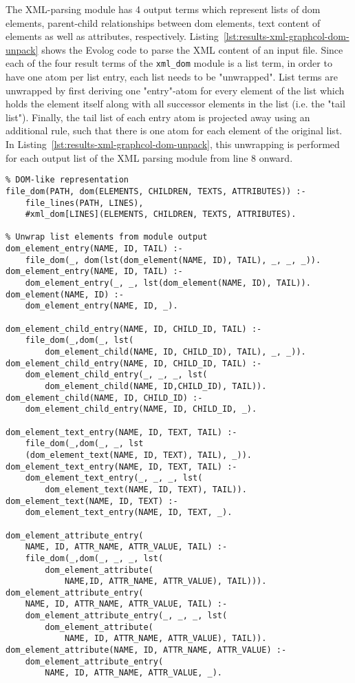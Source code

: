 The XML-parsing module has 4 output terms which represent lists of \gls{dom} elements, parent-child relationships between \gls{dom} elements, text content of elements as well as attributes, respectively. Listing~\ref{lst:results-xml-graphcol-dom-unpack} shows the Evolog code to parse the XML content of an input file. Since each of the four result terms of the \texttt{xml\_dom} module is a list term, in order to have one atom per list entry, each list needs to be "unwrapped". List terms are unwrapped by first deriving one "entry"-atom for every element of the list which holds the element itself along with all successor elements in the list (i.e. the "tail list"). Finally, the tail list of each entry atom is projected away using an additional rule, such that there is one atom for each element of the original list. In Listing~\ref{lst:results-xml-graphcol-dom-unpack}, this unwrapping is performed for each output list of the XML parsing module from line 8 onward.

\begin{lstlisting}[style=asp-code, label={lst:results-xml-graphcol-dom-unpack}, caption={Parsing and consuming XML data in an Evolog program.}]
% Parse the string content of individual lines into a 
% DOM-like representation
file_dom(PATH, dom(ELEMENTS, CHILDREN, TEXTS, ATTRIBUTES)) :- 
    file_lines(PATH, LINES), 
    #xml_dom[LINES](ELEMENTS, CHILDREN, TEXTS, ATTRIBUTES).

% Unwrap list elements from module output
dom_element_entry(NAME, ID, TAIL) :- 
    file_dom(_, dom(lst(dom_element(NAME, ID), TAIL), _, _, _)).
dom_element_entry(NAME, ID, TAIL) :- 
    dom_element_entry(_, _, lst(dom_element(NAME, ID), TAIL)).
dom_element(NAME, ID) :- 
    dom_element_entry(NAME, ID, _).

dom_element_child_entry(NAME, ID, CHILD_ID, TAIL) :- 
    file_dom(_,dom(_, lst(
        dom_element_child(NAME, ID, CHILD_ID), TAIL), _, _)).
dom_element_child_entry(NAME, ID, CHILD_ID, TAIL) :- 
    dom_element_child_entry(_, _, _, lst(
        dom_element_child(NAME, ID,CHILD_ID), TAIL)).
dom_element_child(NAME, ID, CHILD_ID) :- 
    dom_element_child_entry(NAME, ID, CHILD_ID, _).

dom_element_text_entry(NAME, ID, TEXT, TAIL) :- 
    file_dom(_,dom(_, _, lst
    (dom_element_text(NAME, ID, TEXT), TAIL), _)).
dom_element_text_entry(NAME, ID, TEXT, TAIL) :- 
    dom_element_text_entry(_, _, _, lst(
        dom_element_text(NAME, ID, TEXT), TAIL)).
dom_element_text(NAME, ID, TEXT) :- 
    dom_element_text_entry(NAME, ID, TEXT, _).

dom_element_attribute_entry(
    NAME, ID, ATTR_NAME, ATTR_VALUE, TAIL) :- 
    file_dom(_,dom(_, _, _, lst(
        dom_element_attribute(
            NAME,ID, ATTR_NAME, ATTR_VALUE), TAIL))).
dom_element_attribute_entry(
    NAME, ID, ATTR_NAME, ATTR_VALUE, TAIL) :- 
    dom_element_attribute_entry(_, _, _, lst(
        dom_element_attribute(
            NAME, ID, ATTR_NAME, ATTR_VALUE), TAIL)).
dom_element_attribute(NAME, ID, ATTR_NAME, ATTR_VALUE) :- 
    dom_element_attribute_entry(
        NAME, ID, ATTR_NAME, ATTR_VALUE, _).   
\end{lstlisting}  

